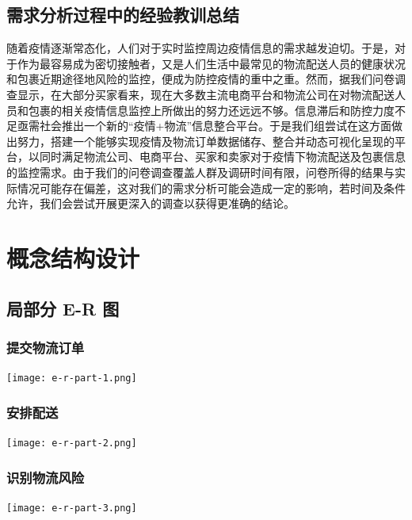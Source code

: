 \documentclass[12pt]{article}
\begin{document}
\subsection{需求分析过程中的经验教训总结}

随着疫情逐渐常态化，人们对于实时监控周边疫情信息的需求越发迫切。于是，对于作为最容易成为密切接触者，又是人们生活中最常见的物流配送人员的健康状况和包裹近期途径地风险的监控，便成为防控疫情的重中之重。然而，据我们问卷调查显示，在大部分买家看来，现在大多数主流电商平台和物流公司在对物流配送人员和包裹的相关疫情信息监控上所做出的努力还远远不够。信息滞后和防控力度不足亟需社会推出一个新的“疫情+物流”信息整合平台。于是我们组尝试在这方面做出努力，搭建一个能够实现疫情及物流订单数据储存、整合并动态可视化呈现的平台，以同时满足物流公司、电商平台、买家和卖家对于疫情下物流配送及包裹信息的监控需求。由于我们的问卷调查覆盖人群及调研时间有限，问卷所得的结果与实际情况可能存在偏差，这对我们的需求分析可能会造成一定的影响，若时间及条件允许，我们会尝试开展更深入的调查以获得更准确的结论。

\section{概念结构设计}

\subsection{局部分 E-R 图 }

\subsubsection{提交物流订单}

\begin{center}
	\texttt{[image: e-r-part-1.png]}
\end{center}

\subsubsection{安排配送}

\begin{center}
	\texttt{[image: e-r-part-2.png]}
\end{center}

\subsubsection{识别物流风险}

\begin{center}
	\texttt{[image: e-r-part-3.png]}
\end{center}
\end{document}
